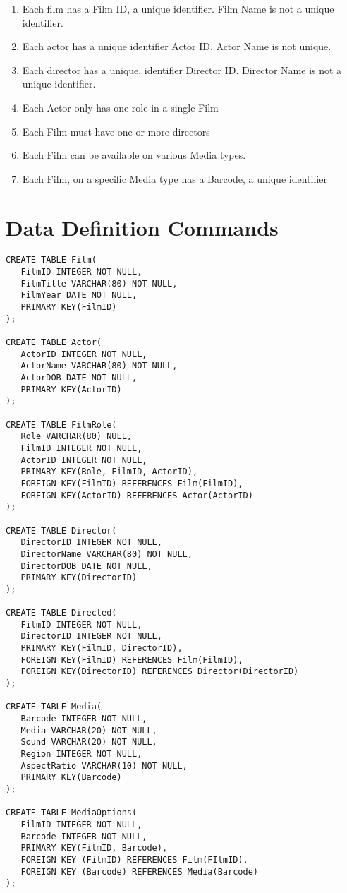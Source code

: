 \documentclass[a4paper,12pt]{article}
\begin{document}
\begin{enumerate}
\item Each film has a Film ID, a unique identifier. Film Name is not a 
unique identifier.

\item Each actor has a unique identifier Actor ID. Actor Name is not
unique.

\item Each director has a unique, identifier Director ID. Director Name
is not a unique identifier.

\item Each Actor only has one role in a single Film

\item Each Film must have one or more directors

\item Each Film can be available on various Media types.

\item Each Film, on a specific Media type has a Barcode, a unique 
identifier
\end{enumerate}

\section{Data Definition Commands}

\begin{verbatim}
CREATE TABLE Film(
   FilmID INTEGER NOT NULL,
   FilmTitle VARCHAR(80) NOT NULL,
   FilmYear DATE NOT NULL,
   PRIMARY KEY(FilmID)
);

CREATE TABLE Actor(
   ActorID INTEGER NOT NULL,
   ActorName VARCHAR(80) NOT NULL,
   ActorDOB DATE NOT NULL,
   PRIMARY KEY(ActorID)
);

CREATE TABLE FilmRole(
   Role VARCHAR(80) NULL,
   FilmID INTEGER NOT NULL,
   ActorID INTEGER NOT NULL,
   PRIMARY KEY(Role, FilmID, ActorID),
   FOREIGN KEY(FilmID) REFERENCES Film(FilmID),
   FOREIGN KEY(ActorID) REFERENCES Actor(ActorID)
);

CREATE TABLE Director(
   DirectorID INTEGER NOT NULL,
   DirectorName VARCHAR(80) NOT NULL,
   DirectorDOB DATE NOT NULL,
   PRIMARY KEY(DirectorID)
);

CREATE TABLE Directed(
   FilmID INTEGER NOT NULL,
   DirectorID INTEGER NOT NULL,
   PRIMARY KEY(FilmID, DirectorID),
   FOREIGN KEY(FilmID) REFERENCES Film(FilmID),
   FOREIGN KEY(DirectorID) REFERENCES Director(DirectorID)
);

CREATE TABLE Media(
   Barcode INTEGER NOT NULL,
   Media VARCHAR(20) NOT NULL,
   Sound VARCHAR(20) NOT NULL,
   Region INTEGER NOT NULL,
   AspectRatio VARCHAR(10) NOT NULL,
   PRIMARY KEY(Barcode)
);

CREATE TABLE MediaOptions(
   FilmID INTEGER NOT NULL,
   Barcode INTEGER NOT NULL,
   PRIMARY KEY(FilmID, Barcode),
   FOREIGN KEY (FilmID) REFERENCES Film(FIlmID),
   FOREIGN KEY (Barcode) REFERENCES Media(Barcode)
);
\end{verbatim}
\end{document}
